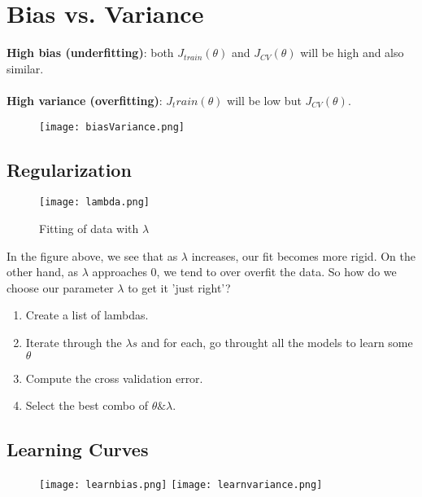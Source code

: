 
\section{Bias vs. Variance}
  \textbf{High bias (underfitting)}: both $J_{train}(\theta)$ and $J_{CV}(\theta)$ will be high and also similar.
  \\\\
  \textbf{High variance (overfitting)}: $J_train(\theta)$ will be low but $J_{CV}(\theta)$.\\

  \begin{figure}[h]
    \centering
    \texttt{[image: biasVariance.png]}
  \end{figure}

  \subsection{Regularization}

    \begin{figure}[h]
      \centering
      \texttt{[image: lambda.png]}
      \caption{Fitting of data with $\lambda$}
    \end{figure}

    In the figure above, we see that as $\lambda$ increases, our fit becomes more rigid. On the other hand, as $\lambda$ approaches 0, we tend to over overfit the data. So how do we choose our parameter $\lambda$ to get it 'just right'?

    \begin{enumerate}
      \item Create a list of lambdas.
      \item Iterate through the $\lambda s$ and for each, go throught all the models to learn some $\theta$
      \item Compute the cross validation error.
      \item Select the best combo of $\theta \& \lambda$.
    \end{enumerate}    

  \subsection{Learning Curves}
    \begin{figure}[h]
      \centering
      \texttt{[image: learnbias.png]}
      \texttt{[image: learnvariance.png]}
    \end{figure}    


